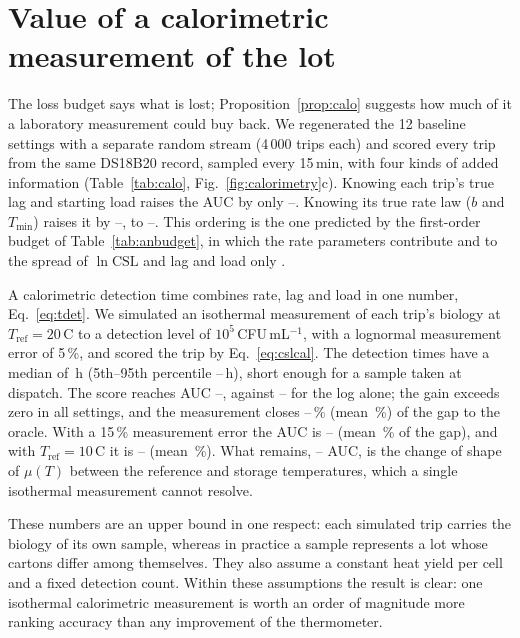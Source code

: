 \documentclass[11pt,a4paper,twoside,openany]{book}
\newcommand{\CSL}{\mathrm{CSL}}
\newcommand{\degC}{\,\textdegree C}
\theoremstyle{plain}\newtheorem{proposition}{Proposition}\newtheorem{corollary}{Corollary}
\theoremstyle{definition}\newtheorem{definition}{Definition}[chapter]
\begin{document}
\section{Value of a calorimetric measurement of the lot}\label{sec:calores}
The loss budget says what is lost; Proposition~\ref{prop:calo} suggests how much of it a laboratory measurement could buy back. We regenerated the 12 baseline settings with a separate random stream (4\,000 trips each) and scored every trip from the same DS18B20 record, sampled every 15\,min, with four kinds of added information (Table~\ref{tab:calo}, Fig.~\ref{fig:calorimetry}c). Knowing each trip's true lag and starting load raises the AUC by only \CalGainBudMin--\CalGainBudMax. Knowing its true rate law ($b$ and $T_{\min}$) raises it by \CalGainRateMin--\CalGainRateMax, to \CalRateMin--\CalRateMax. This ordering is the one predicted by the first-order budget of Table~\ref{tab:anbudget}, in which the rate parameters contribute \AnSdB{} and \AnSdT{} to the spread of $\ln\CSL$ and lag and load only \AnSdK.

A calorimetric detection time combines rate, lag and load in one number, Eq.~\eqref{eq:tdet}. We simulated an isothermal measurement of each trip's biology at $T_{\mathrm{ref}}=20$\degC{} to a detection level of $10^5$\,CFU\,mL$^{-1}$, with a lognormal measurement error of 5\,\%, and scored the trip by Eq.~\eqref{eq:cslcal}. The detection times have a median of \CalTdetMed\,h (5th--95th percentile \CalTdetLo--\CalTdetHi\,h), short enough for a sample taken at dispatch. The score reaches AUC \CalCalMin--\CalCalMax, against \CalNomMin--\CalNomMax{} for the log alone; the gain exceeds zero in all \CalGainCalSig{} settings, and the measurement closes \CalFracMin--\CalFracMax\,\% (mean \CalFracMean\,\%) of the gap to the oracle. With a 15\,\% measurement error the AUC is \CalSensBMin--\CalSensBMax{} (mean \CalSensBFrac\,\% of the gap), and with $T_{\mathrm{ref}}=10$\degC{} it is \CalSensCMin--\CalSensCMax{} (mean \CalSensCFrac\,\%). What remains, \CalRestMin--\CalRestMax{} AUC, is the change of shape of $\mu(T)$ between the reference and storage temperatures, which a single isothermal measurement cannot resolve.

These numbers are an upper bound in one respect: each simulated trip carries the biology of its own sample, whereas in practice a sample represents a lot whose cartons differ among themselves. They also assume a constant heat yield per cell and a fixed detection count. Within these assumptions the result is clear: one isothermal calorimetric measurement is worth an order of magnitude more ranking accuracy than any improvement of the thermometer.
\end{document}
